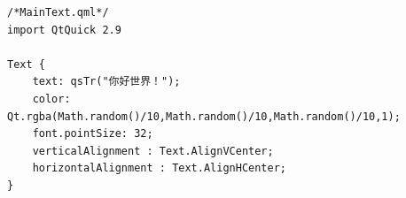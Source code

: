 \begin{lstlisting}[label=f000033,
caption=GoodLuck,
title=\lstlistingname\ \thelstlisting
]
/*MainText.qml*/
import QtQuick 2.9

Text {
    text: qsTr("你好世界！");
    color: Qt.rgba(Math.random()/10,Math.random()/10,Math.random()/10,1);
    font.pointSize: 32;
    verticalAlignment : Text.AlignVCenter;
    horizontalAlignment : Text.AlignHCenter;
}
\end{lstlisting}          %










